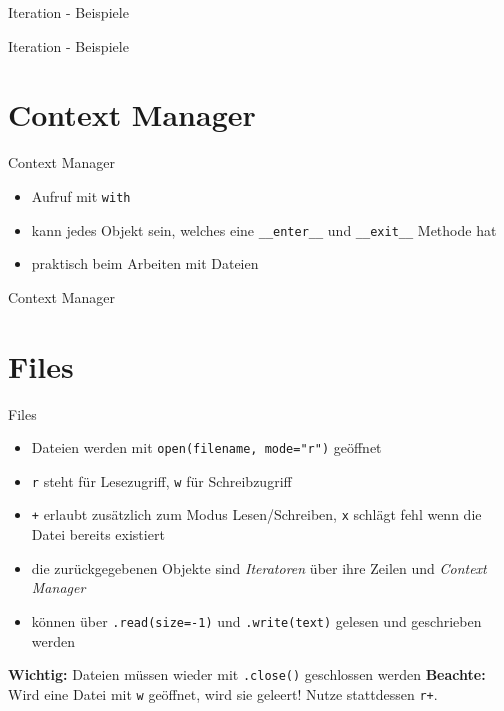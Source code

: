 \begin{frame}{Iteration - Beispiele}
	
\end{frame}

\begin{frame}{Iteration - Beispiele}
	
\end{frame}


\section{Context Manager}

\begin{frame}{Context Manager}
	\begin{itemize}
		\item Aufruf mit \alert{\texttt{with}}
		\item kann jedes Objekt sein, welches eine \texttt{\_\_enter\_\_} und \texttt{\_\_exit\_\_} Methode hat
		\item praktisch beim Arbeiten mit Dateien
	\end{itemize}
\end{frame}

\begin{frame}{Context Manager}
	
\end{frame}


\section{Files}

\begin{frame}{Files}
	\begin{itemize}
		\item Dateien werden mit \alert{\texttt{open(filename, mode="r")}} geöffnet
		\item \texttt{r} steht für Lesezugriff,  \texttt{w} für Schreibzugriff
		\item \texttt{+} erlaubt zusätzlich zum Modus Lesen/Schreiben, \texttt{x} schlägt fehl wenn die Datei bereits existiert
		\item die zurückgegebenen Objekte sind \textit{Iteratoren} über ihre Zeilen und \textit{Context Manager}
		\item können über \alert{\texttt{.read(size=-1)}} und \alert{\texttt{.write(text)}} gelesen und geschrieben werden
	\end{itemize}
	\textbf{Wichtig:} Dateien müssen wieder mit \alert{\texttt{.close()}} geschlossen werden
	\textbf{Beachte:} Wird eine Datei mit \texttt{w} geöffnet, wird sie geleert! Nutze stattdessen \texttt{r+}.
\end{frame}

